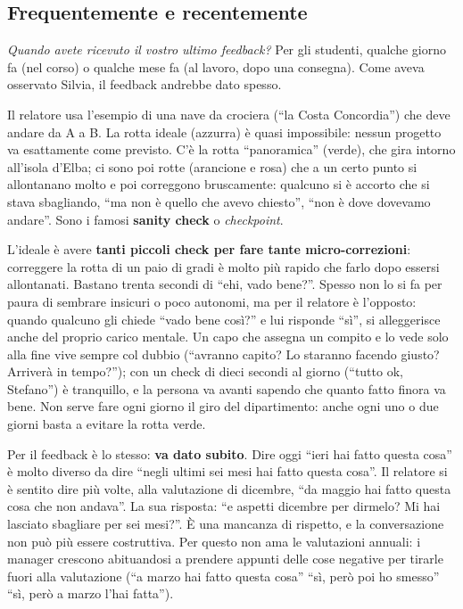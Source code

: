 \subsection{Frequentemente e recentemente}

\emph{Quando avete ricevuto il vostro ultimo feedback?} Per gli studenti,
qualche giorno fa (nel corso) o qualche mese fa (al lavoro, dopo una
consegna). Come aveva osservato Silvia, il feedback andrebbe dato
spesso.

Il relatore usa l'esempio di una nave da crociera (``la Costa Concordia'') che
deve andare da A a B. La rotta ideale (azzurra) è quasi impossibile: nessun
progetto va esattamente come previsto. C'è la rotta ``panoramica'' (verde), che
gira intorno all'isola d'Elba; ci sono poi rotte (arancione e rosa) che a un
certo punto si allontanano molto e poi correggono bruscamente: qualcuno si è
accorto che si stava sbagliando, ``ma non è quello che avevo chiesto'',
``non è dove dovevamo andare''. Sono i famosi \textbf{sanity check} o
\emph{checkpoint}.

L'ideale è avere \textbf{tanti piccoli check per fare tante micro-correzioni}:
correggere la rotta di un paio di gradi è molto più rapido che farlo dopo
essersi allontanati. Bastano trenta secondi di ``ehi, vado bene?''. Spesso non
lo si fa per paura di sembrare insicuri o poco autonomi, ma per il relatore è
l'opposto: quando qualcuno gli chiede ``vado bene così?'' e lui risponde
``sì'', si alleggerisce anche del proprio carico mentale. Un capo che assegna
un compito e lo vede solo alla fine vive sempre col dubbio (``avranno capito?
Lo staranno facendo giusto? Arriverà in tempo?''); con un check di dieci
secondi al giorno (``tutto ok, Stefano'') è tranquillo, e la persona va avanti
sapendo che quanto fatto finora va bene. Non serve fare ogni giorno il giro del
dipartimento: anche ogni uno o due giorni basta a evitare la rotta verde.

Per il feedback è lo stesso: \textbf{va dato subito}. Dire oggi ``ieri hai
fatto questa cosa'' è molto diverso da dire ``negli ultimi sei mesi hai fatto
questa cosa''. Il relatore si è sentito dire più volte, alla valutazione di
dicembre, ``da maggio hai fatto questa cosa che non andava''. La sua risposta:
``e aspetti dicembre per dirmelo? Mi hai lasciato sbagliare per sei mesi?''. È
una mancanza di rispetto, e la conversazione non può più essere costruttiva.
Per questo non ama le valutazioni annuali: i manager crescono abituandosi a
prendere appunti delle cose negative per tirarle fuori alla valutazione
(``a marzo hai fatto questa cosa'' ``sì, però poi ho smesso'' ``sì, però a
marzo l'hai fatta'').

